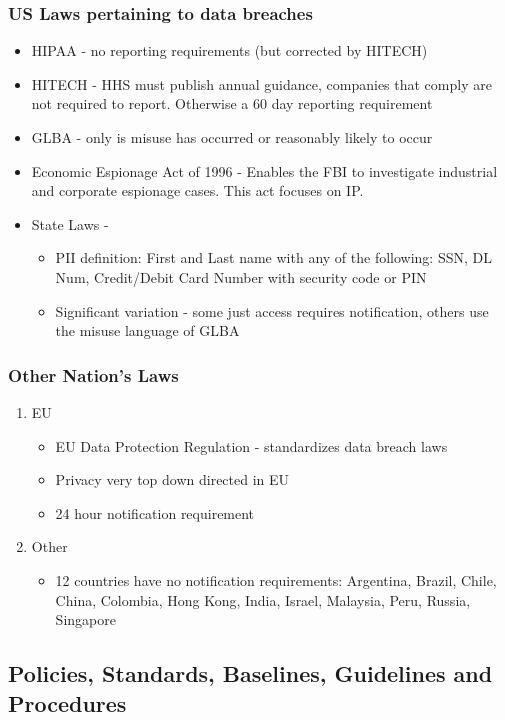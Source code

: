 \documentclass[11pt]{article}
\begin{document}
\subsubsection{US Laws pertaining to data breaches}
\label{sec:org1c30ce7}
\begin{itemize}
\item HIPAA - no reporting requirements (but corrected by HITECH)
\item HITECH - HHS must publish annual guidance, companies that comply are not required to report. Otherwise a 60 day reporting requirement
\item GLBA - only is misuse has occurred or reasonably likely to occur
\item Economic Espionage Act of 1996 - Enables the FBI to investigate industrial and corporate espionage cases. This act focuses on IP.
\item State Laws - 
\begin{itemize}
\item PII definition: First and Last name with any of the following: SSN, DL Num, Credit/Debit Card Number with security code or PIN
\item Significant variation - some just access requires notification, others use the misuse language of GLBA
\end{itemize}
\end{itemize}
\subsubsection{Other Nation's Laws}
\label{sec:org16b02e1}
\begin{enumerate}
\item EU
\label{sec:org41d19c8}
\begin{itemize}
\item EU Data Protection Regulation - standardizes data breach laws
\item Privacy very top down directed in EU
\item 24 hour notification requirement
\end{itemize}
\item Other
\label{sec:org704546f}
\begin{itemize}
\item 12 countries have no notification requirements: Argentina, Brazil, Chile, China, Colombia, Hong Kong, India, Israel, Malaysia, Peru, Russia, Singapore
\end{itemize}
\end{enumerate}
\subsection{Policies, Standards, Baselines, Guidelines and Procedures}
\label{sec:orgb333a20}
\end{document}

